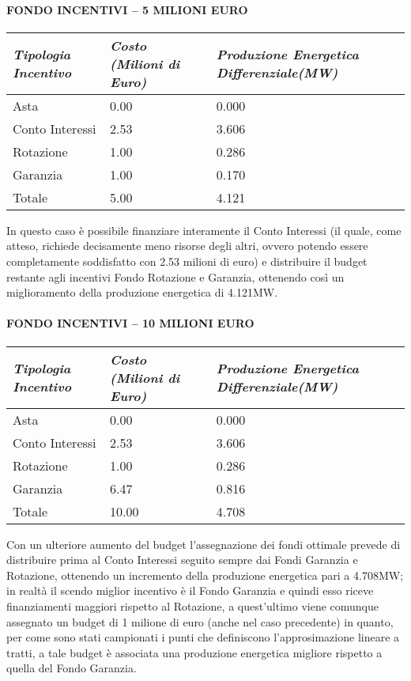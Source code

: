 \documentclass[12pt,a4paper,openright,twoside]{report}
\begin{document}
\paragraph{FONDO INCENTIVI – 5 MILIONI EURO}
\begin{center}
	\begin{tabular}{ | p{4.5cm}  | p{4.5cm} | p{4.5cm} | }
		\hline
		\nohyphens{\emph{Tipologia Incentivo}} & \nohyphens{\emph{Costo (Milioni di Euro)}} & \nohyphens{\emph{Produzione Energetica Differenziale(MW)}} \\ \hline
		Asta &  0.00 & 0.000 \\ \hline
		Conto Interessi & 2.53 & 3.606 \\ \hline
		Rotazione & 1.00 & 0.286 \\ \hline
		Garanzia & 1.00 & 0.170 \\ \hline \hline 
		Totale & 5.00 & 4.121 \\
		\hline
	\end{tabular}
\end{center}
In questo caso è possibile finanziare interamente il Conto Interessi (il quale, come atteso, richiede decisamente meno risorse degli altri, ovvero potendo essere completamente soddisfatto con 2.53 milioni di euro) e distribuire il budget restante agli incentivi Fondo Rotazione e Garanzia, ottenendo così un miglioramento della produzione energetica di 4.121MW.

\paragraph{FONDO INCENTIVI – 10 MILIONI EURO}
\begin{center}
	\begin{tabular}{ | p{4.5cm}  | p{4.5cm} | p{4.5cm} | }
		\hline
		\nohyphens{\emph{Tipologia Incentivo}} & \nohyphens{\emph{Costo (Milioni di Euro)}} & \nohyphens{\emph{Produzione Energetica Differenziale(MW)}} \\ \hline
		Asta &  0.00 & 0.000 \\ \hline
		Conto Interessi & 2.53 & 3.606 \\ \hline
		Rotazione & 1.00 & 0.286 \\ \hline
		Garanzia & 6.47 & 0.816 \\ \hline \hline 
		Totale & 10.00 & 4.708 \\
		\hline
	\end{tabular}
\end{center}
Con un ulteriore aumento del budget l'assegnazione dei fondi ottimale prevede di distribuire prima al Conto Interessi seguito sempre dai Fondi Garanzia e Rotazione, ottenendo un incremento della produzione energetica pari a 4.708MW; in realtà il scendo miglior incentivo è il Fondo Garanzia e quindi esso riceve finanziamenti maggiori rispetto al Rotazione, a quest'ultimo viene comunque assegnato un budget di 1 milione di euro (anche nel caso precedente) in quanto, per come sono stati campionati i punti che definiscono l'approsimazione lineare a tratti, a tale budget è associata una produzione energetica migliore rispetto a quella del Fondo Garanzia.
\end{document}
